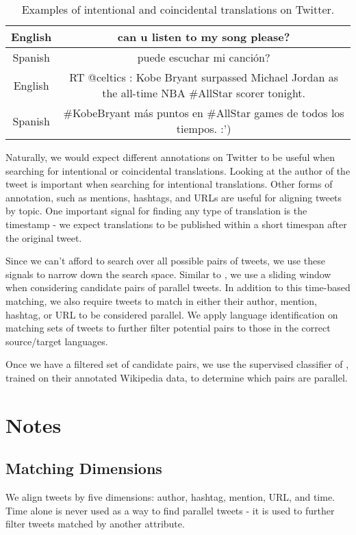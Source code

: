 \documentclass[11pt,letterpaper]{article}
\begin{document}
\begin{table*}
\begin{tabular}{|c|c|}
\hline
English & can u listen to my song please? \\
\hline
Spanish & puede escuchar mi canción? \\
\hline
\hline
English & RT @celtics : Kobe Bryant surpassed Michael Jordan as the all-time NBA
\#AllStar scorer tonight.\\
\hline
Spanish & \#KobeBryant más puntos en \#AllStar games de todos los tiempos. :')\\
\hline
\end{tabular}
\caption{Examples of intentional and coincidental translations on Twitter.}
\label{tab:ex_tweets}
\end{table*}

Naturally, we would expect different annotations on Twitter to be useful when
searching for intentional or coincidental translations. Looking at the author of
the tweet is important when searching for intentional translations. Other forms
of annotation, such as mentions, hashtags, and URLs are useful for aligning tweets by
topic. One important signal for finding any type of translation is the timestamp - we
expect translations to be published within a short timespan after the original
tweet.

Since we can't afford to search over all possible pairs of tweets, we use these
signals to narrow down the search space.
Similar to , we use a sliding window when considering
candidate pairs of parallel tweets. In addition to this time-based matching, we
also require tweets to match in either their author, mention, hashtag, or URL to be
considered parallel.
We apply language identification \cite{Bergsma12} on matching sets of tweets to
further filter potential pairs to those in the correct source/target languages.

Once we have a filtered set of candidate pairs, we use the supervised classifier
of , trained on their annotated Wikipedia data, to determine which
pairs are parallel.

\section{Notes}

\subsection{Matching Dimensions}
We align tweets by five dimensions: author, hashtag, mention, URL, and time.
Time alone is never used as a way to find parallel tweets - it is used to
further filter tweets matched by another attribute.
\end{document}
